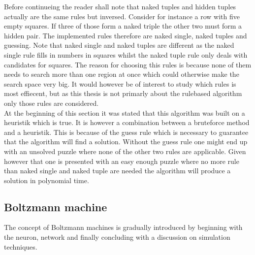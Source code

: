 \documentclass[a4paper,11pt]{kth-mag}
\begin{document}
Before continueing the reader shall note that naked tuples and hidden tuples actually are the same rules but inversed.
Consider for instance a row with five empty squares.
If three of those form a naked triple the other two must form a hidden pair.
The implemented rules therefore are naked single, naked tuples and guessing.
Note that naked single and naked tuples are different as the naked single rule fills in numbers in squares whilst the naked tuple rule only deals with candidates for squares.
The reason for choosing this rules is because none of them needs to search more than one region at once which could otherwise make the search space very big. It would however be of interest to study which rules is most effiecent, but as this thesis is not primarly about the rulebased algorithm only those rules are considered.
\\
At the beginning of this section it was stated that this algorithm was built on a heuristik which is true.
It is however a combination between a bruteforce method and a heuristik.
This is because of the guess rule which is necessary to guarantee that the algorithm will find a solution.
Without the guess rule one might end up with an unsolved puzzle where none of the other two rules are applicable.
Given however that one is presented with an easy enough puzzle where no more rule than naked single and naked tuple are needed the algorithm will produce a solution in polynomial time.

\FloatBarrier
\subsection{Boltzmann machine}
The concept of Boltzmann machines is gradually introduced by beginning with the neuron, network and finally concluding with a discussion on simulation techniques.\\
\end{document}
